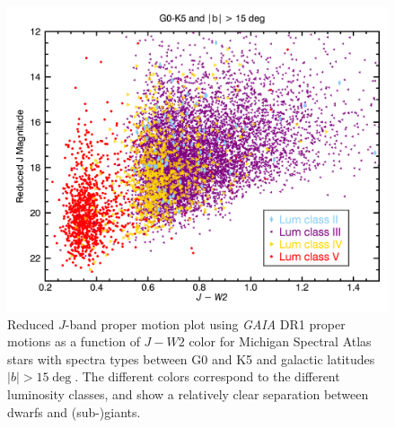 
\begin{figure}[t]
\label{fig:absolute_j_jw1}
  \begin{center}
      \includegraphics[width=1.0\textwidth,clip=true]{Figures/absolute_j/plot-J-W2-G0-K5-b15-0.png}
 \end{center}
 \caption{Reduced $J$-band proper motion plot using \textit{GAIA} DR1 proper motions as a function of $J-W2$ color for Michigan Spectral Atlas stars with spectra types between G0 and K5 and galactic latitudes $|b|>15\deg$.  The different colors correspond to the different luminosity classes, and show a relatively clear separation between dwarfs and (sub-)giants.}
\end{figure}

